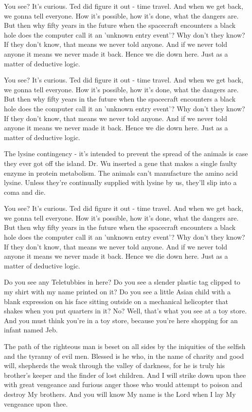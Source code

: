 \documentclass{book}
\begin{document}
You see? It's curious. Ted did figure it out - time travel. And when we get back, we gonna tell everyone. How it's possible, how it's done, what the dangers are. But then why fifty years in the future when the spacecraft encounters a black hole does the computer call it an 'unknown entry event'? Why don't they know? If they don't know, that means we never told anyone. And if we never told anyone it means we never made it back. Hence we die down here. Just as a matter of deductive logic.

You see? It's curious. Ted did figure it out - time travel. And when we get back, we gonna tell everyone. How it's possible, how it's done, what the dangers are. But then why fifty years in the future when the spacecraft encounters a black hole does the computer call it an 'unknown entry event'? Why don't they know? If they don't know, that means we never told anyone. And if we never told anyone it means we never made it back. Hence we die down here. Just as a matter of deductive logic.

The lysine contingency - it's intended to prevent the spread of the animals is case they ever got off the island. Dr. Wu inserted a gene that makes a single faulty enzyme in protein metabolism. The animals can't manufacture the amino acid lysine. Unless they're continually supplied with lysine by us, they'll slip into a coma and die.

You see? It's curious. Ted did figure it out - time travel. And when we get back, we gonna tell everyone. How it's possible, how it's done, what the dangers are. But then why fifty years in the future when the spacecraft encounters a black hole does the computer call it an 'unknown entry event'? Why don't they know? If they don't know, that means we never told anyone. And if we never told anyone it means we never made it back. Hence we die down here. Just as a matter of deductive logic.

Do you see any Teletubbies in here? Do you see a slender plastic tag clipped to my shirt with my name printed on it? Do you see a little Asian child with a blank expression on his face sitting outside on a mechanical helicopter that shakes when you put quarters in it? No? Well, that's what you see at a toy store. And you must think you're in a toy store, because you're here shopping for an infant named Jeb.

The path of the righteous man is beset on all sides by the iniquities of the selfish and the tyranny of evil men. Blessed is he who, in the name of charity and good will, shepherds the weak through the valley of darkness, for he is truly his brother's keeper and the finder of lost children. And I will strike down upon thee with great vengeance and furious anger those who would attempt to poison and destroy My brothers. And you will know My name is the Lord when I lay My vengeance upon thee.
\end{document}
